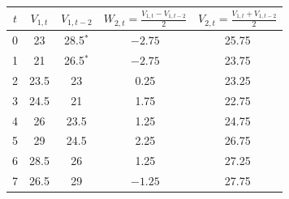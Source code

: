 \begin{tabular}{ccccc}
\toprule
$t$ & $V_{1,t}$ & $V_{1,t-2}$ & $W_{2,t}=\frac{V_{1,t}-V_{1,t-2}}{2}$ & $V_{2,t}=\frac{V_{1,t}+V_{1,t-2}}{2}$ \\
\midrule
0 & 23 & 28.5$^{\ast}$ & $-2.75$ & 25.75 \\
1 & 21 & 26.5$^{\ast}$ & $-2.75$ & 23.75 \\
2 & 23.5 & 23 & 0.25 & 23.25 \\
3 & 24.5 & 21 & 1.75 & 22.75 \\
4 & 26 & 23.5 & 1.25 & 24.75 \\
5 & 29 & 24.5 & 2.25 & 26.75 \\
6 & 28.5 & 26 & 1.25 & 27.25 \\
7 & 26.5 & 29 & $-1.25$ & 27.75 \\
\bottomrule
\end{tabular}